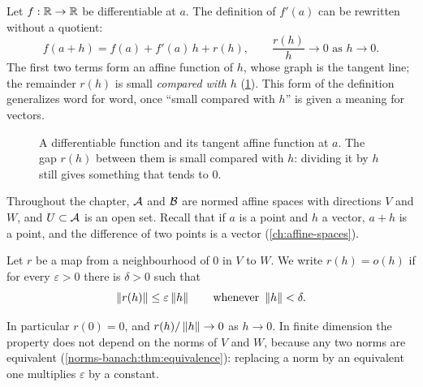 \begin{notechapter}
Let $f:\mathbb{R}\to\mathbb{R}$ be differentiable at $a$. The definition of $f'(a)$ can be
rewritten without a quotient:
\[
  f(a + h) = f(a) + f'(a)\,h + r(h) ,
  \qquad \frac{r(h)}h\to0 \text{ as } h\to0 .
\]
The first two terms form an affine function of $h$, whose graph is the
tangent line; the remainder $r(h)$ is small \emph{compared with} $h$
(\cref{differential:fig:tangent}). This form of the definition generalizes
word for word, once ``small compared with $h$'' is given a meaning for
vectors.

\begin{figure}[ht]
\centering
{}
\caption{A differentiable function and its tangent affine function at
$a$. The gap $r(h)$ between them is small compared with $h$: dividing it
by $h$ still gives something that tends to $0$.}
\label{differential:fig:tangent}
\end{figure}

Throughout the chapter, $\mathcal{A}$ and $\mathcal{B}$ are normed affine spaces with
directions $V$ and $W$, and $U\subset\mathcal{A}$ is an open set. Recall that if
$a$ is a point and $h$ a vector, $a + h$ is a point, and the difference of
two points is a vector (\cref{ch:affine-spaces}).

\begin{definition}[Little-$o$]\label{differential:def:little-o}
Let $r$ be a map from a neighbourhood of $0$ in $V$ to $W$. We write
$r(h) = o(h)$ if for every $\varepsilon > 0$ there is $\delta > 0$ such
that
\[
  \left\|r(h)\right\|\leq\varepsilon\left\|h\right\| \qquad\text{whenever } \left\|h\right\| < \delta .
\]
\end{definition}

In particular $r(0) = 0$, and $r(h)/\left\|h\right\|\to0$ as $h\to0$. In finite
dimension the property does not depend on the norms of $V$ and $W$,
because any two norms are equivalent (\cref{norms-banach:thm:equivalence}):
replacing a norm by an equivalent one multiplies $\varepsilon$ by a
constant.


\end{notechapter}
